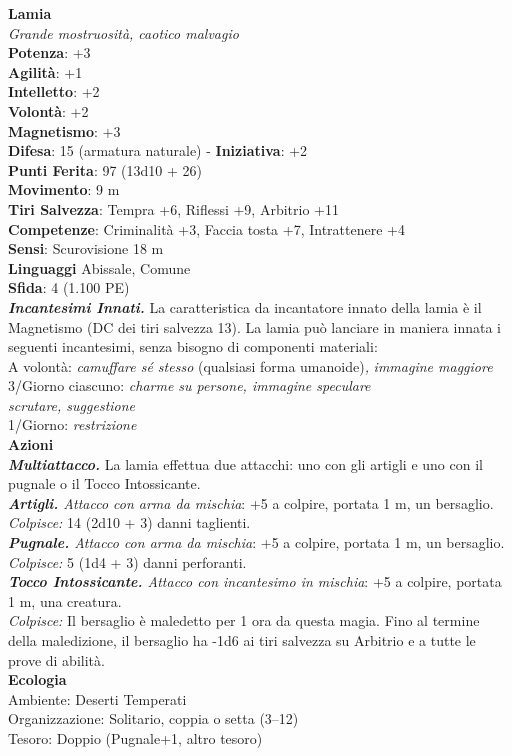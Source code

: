 \begin{multicols}{2}
\medskip\textbf{Lamia}\\
\emph{Grande mostruosità, caotico malvagio}\\
\textbf{Potenza}: +3\\
\textbf{Agilità}: +1\\
\textbf{Intelletto}: +2\\
\textbf{Volontà}: +2\\
\textbf{Magnetismo}: +3\\
\textbf{Difesa}: 15 (armatura naturale) - \textbf{Iniziativa}: +2\\
\textbf{Punti Ferita}: 97 (13d10 + 26)\\
\textbf{Movimento}: 9 m\\
\textbf{Tiri Salvezza}: Tempra +6, Riflessi +9, Arbitrio +11\\
\textbf{Competenze}: Criminalità +3, Faccia tosta +7, Intrattenere +4\\
\textbf{Sensi}: Scurovisione 18 m\\
\textbf{Linguaggi} Abissale, Comune\\
\textbf{Sfida}: 4 (1.100 PE)\smallskip\\
\emph{\textbf{Incantesimi Innati.}} La caratteristica da incantatore innato della lamia è il Magnetismo (DC dei tiri salvezza 13). La lamia può lanciare in maniera innata i seguenti incantesimi, senza bisogno di componenti materiali:\\
A volontà: \emph{camuffare sé stesso} (qualsiasi forma umanoide)\emph{,} \emph{immagine maggiore}\\
3/Giorno ciascuno: \emph{charme su persone, immagine speculare}\\
\emph{scrutare, suggestione}\\
1/Giorno: \emph{restrizione}\\
\smallskip\textbf{Azioni}\\
\emph{\textbf{Multiattacco.}} La lamia effettua due attacchi: uno con gli artigli e uno con il pugnale o il Tocco Intossicante.\\
\emph{\textbf{Artigli.} Attacco con arma da mischia}: +5 a colpire, portata 1 m, un bersaglio.\\
\emph{Colpisce:} 14 (2d10 + 3) danni taglienti.\\
\emph{\textbf{Pugnale.} Attacco con arma da mischia}: +5 a colpire, portata 1 m, un bersaglio.\\
\emph{Colpisce:} 5 (1d4 + 3) danni perforanti.\\
\emph{\textbf{Tocco Intossicante.} Attacco con incantesimo in mischia}: +5 a colpire, portata 1 m, una creatura.\\
\emph{Colpisce:} Il bersaglio è maledetto per 1 ora da questa magia. Fino al termine della maledizione, il bersaglio ha -1d6 ai tiri salvezza su Arbitrio e a tutte le prove di abilità.\\
\textbf{Ecologia}\\
Ambiente: Deserti Temperati\\
Organizzazione: Solitario, coppia o setta (3–12)\\
Tesoro: Doppio (Pugnale+1, altro tesoro)\\


\end{multicols}
